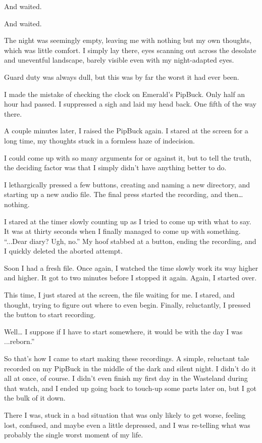 And waited.

And waited.

The night was seemingly empty, leaving me with nothing but my own thoughts, which was little comfort. I simply lay there, eyes scanning out across the desolate and uneventful landscape, barely visible even with my night-adapted eyes.

Guard duty was always dull, but this was by far the worst it had ever been.

I made the mistake of checking the clock on Emerald’s PipBuck. Only half an hour had passed. I suppressed a sigh and laid my head back. One fifth of the way there.

A couple minutes later, I raised the PipBuck again. I stared at the screen for a long time, my thoughts stuck in a formless haze of indecision.

I could come up with so many arguments for or against it, but to tell the truth, the deciding factor was that I simply didn’t have anything better to do.

I lethargically pressed a few buttons, creating and naming a new directory, and starting up a new audio file. The final press started the recording, and then… nothing.

I stared at the timer slowly counting up as I tried to come up with what to say. It was at thirty seconds when I finally managed to come up with something. “...Dear diary? Ugh, no.” My hoof stabbed at a button, ending the recording, and I quickly deleted the aborted attempt.

Soon I had a fresh file. Once again, I watched the time slowly work its way higher and higher. It got to two minutes before I stopped it again. Again, I started over.

This time, I just stared at the screen, the file waiting for me. I stared, and thought, trying to figure out where to even begin. Finally, reluctantly, I pressed the button to start recording.

\leavevmode{}Well… I suppose if I have to start somewhere, it would be with the day I was ...reborn.”

{\br}%
So that’s how I came to start making these recordings. A simple, reluctant tale recorded on my PipBuck in the middle of the dark and silent night. I didn’t do it all at once, of course. I didn’t even finish my first day in the Wasteland during that watch, and I ended up going back to touch-up some parts later on, but I got the bulk of it down.

There I was, stuck in a bad situation that was only likely to get worse, feeling lost, confused, and maybe even a little depressed, and I was re-telling what was probably the single worst moment of my life.

